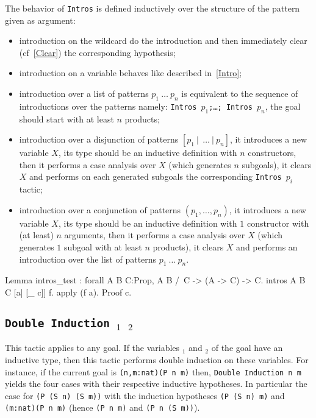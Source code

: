 The behavior of \texttt{Intros} is defined inductively over the
structure of the pattern given as argument:
\begin{itemize}
\item introduction on the wildcard do the introduction and then
  immediately clear (cf~\ref{Clear}) the corresponding hypothesis;
\item introduction on a variable behaves like described in~\ref{Intro}; 
\item introduction over a
list of patterns $p_1~\ldots~p_n$ is equivalent to the sequence of
introductions over the patterns namely:
\texttt{Intros $p_1$;\ldots; Intros $p_n$}, the goal should start with
at least $n$ products;
\item introduction over a
disjunction of patterns $[p_1~|~~\ldots~|~p_n]$, it 
introduces a new variable $X$, its type should be an inductive
definition with $n$
constructors, then it performs a case analysis over $X$ 
(which generates $n$ subgoals), it 
clears $X$ and performs on each generated subgoals the corresponding
\texttt{Intros}~$p_i$ tactic;
\item introduction over a 
conjunction  of patterns $(p_1,\ldots,p_n)$, it
introduces a new variable $X$, its type should be an inductive 
definition with $1$
constructor with (at least) $n$ arguments, then it performs a case 
analysis over $X$ 
(which generates $1$ subgoal with at least $n$ products), it 
clears $X$ and performs an introduction over the list of patterns $p_1~\ldots~p_n$.
\end{itemize}
\begin{coq_example}
Lemma intros_test : forall A B C:Prop, A \/ B /\ C -> (A -> C) -> C.
intros A B C [a| [_ c]] f.
apply (f a).
Proof c.
\end{coq_example}


\subsection {\tt Double Induction \ident$_1$ \ident$_2$}
This tactic applies to any goal. If the variables {\ident$_1$} and {\ident$_2$}
of the goal have an inductive type, then this tactic
performs double induction on these variables.
For instance, if the current goal is \verb+(n,m:nat)(P n m)+ then,
{\tt Double Induction n m} yields the four cases with their respective
inductive hypotheses. In particular the case for
\verb+(P (S n) (S m))+
with the induction hypotheses \verb+(P (S n) m)+ and 
\verb+(m:nat)(P n m)+ (hence \verb+(P n m)+ and \verb+(P n (S m))+).

